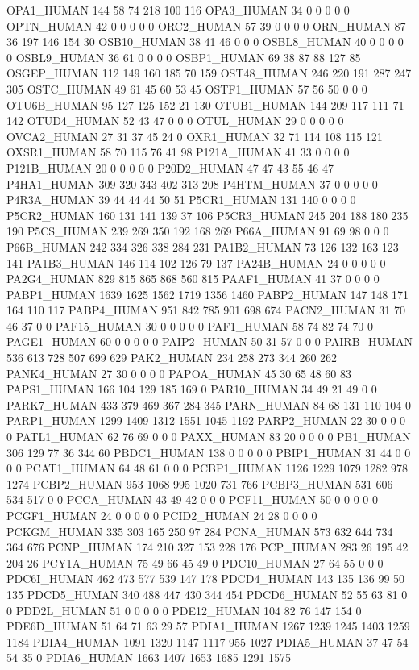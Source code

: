 OPA1_HUMAN	144	58	74	218	100	116
OPA3_HUMAN	34	0	0	0	0	0
OPTN_HUMAN	42	0	0	0	0	0
ORC2_HUMAN	57	39	0	0	0	0
ORN_HUMAN	87	36	197	146	154	30
OSB10_HUMAN	38	41	46	0	0	0
OSBL8_HUMAN	40	0	0	0	0	0
OSBL9_HUMAN	36	61	0	0	0	0
OSBP1_HUMAN	69	38	87	88	127	85
OSGEP_HUMAN	112	149	160	185	70	159
OST48_HUMAN	246	220	191	287	247	305
OSTC_HUMAN	49	61	45	60	53	45
OSTF1_HUMAN	57	56	50	0	0	0
OTU6B_HUMAN	95	127	125	152	21	130
OTUB1_HUMAN	144	209	117	111	71	142
OTUD4_HUMAN	52	43	47	0	0	0
OTUL_HUMAN	29	0	0	0	0	0
OVCA2_HUMAN	27	31	37	45	24	0
OXR1_HUMAN	32	71	114	108	115	121
OXSR1_HUMAN	58	70	115	76	41	98
P121A_HUMAN	41	33	0	0	0	0
P121B_HUMAN	20	0	0	0	0	0
P20D2_HUMAN	47	47	43	55	46	47
P4HA1_HUMAN	309	320	343	402	313	208
P4HTM_HUMAN	37	0	0	0	0	0
P4R3A_HUMAN	39	44	44	44	50	51
P5CR1_HUMAN	131	140	0	0	0	0
P5CR2_HUMAN	160	131	141	139	37	106
P5CR3_HUMAN	245	204	188	180	235	190
P5CS_HUMAN	239	269	350	192	168	269
P66A_HUMAN	91	69	98	0	0	0
P66B_HUMAN	242	334	326	338	284	231
PA1B2_HUMAN	73	126	132	163	123	141
PA1B3_HUMAN	146	114	102	126	79	137
PA24B_HUMAN	24	0	0	0	0	0
PA2G4_HUMAN	829	815	865	868	560	815
PAAF1_HUMAN	41	37	0	0	0	0
PABP1_HUMAN	1639	1625	1562	1719	1356	1460
PABP2_HUMAN	147	148	171	164	110	117
PABP4_HUMAN	951	842	785	901	698	674
PACN2_HUMAN	31	70	46	37	0	0
PAF15_HUMAN	30	0	0	0	0	0
PAF1_HUMAN	58	74	82	74	70	0
PAGE1_HUMAN	60	0	0	0	0	0
PAIP2_HUMAN	50	31	57	0	0	0
PAIRB_HUMAN	536	613	728	507	699	629
PAK2_HUMAN	234	258	273	344	260	262
PANK4_HUMAN	27	30	0	0	0	0
PAPOA_HUMAN	45	30	65	48	60	83
PAPS1_HUMAN	166	104	129	185	169	0
PAR10_HUMAN	34	49	21	49	0	0
PARK7_HUMAN	433	379	469	367	284	345
PARN_HUMAN	84	68	131	110	104	0
PARP1_HUMAN	1299	1409	1312	1551	1045	1192
PARP2_HUMAN	22	30	0	0	0	0
PATL1_HUMAN	62	76	69	0	0	0
PAXX_HUMAN	83	20	0	0	0	0
PB1_HUMAN	306	129	77	36	344	60
PBDC1_HUMAN	138	0	0	0	0	0
PBIP1_HUMAN	31	44	0	0	0	0
PCAT1_HUMAN	64	48	61	0	0	0
PCBP1_HUMAN	1126	1229	1079	1282	978	1274
PCBP2_HUMAN	953	1068	995	1020	731	766
PCBP3_HUMAN	531	606	534	517	0	0
PCCA_HUMAN	43	49	42	0	0	0
PCF11_HUMAN	50	0	0	0	0	0
PCGF1_HUMAN	24	0	0	0	0	0
PCID2_HUMAN	24	28	0	0	0	0
PCKGM_HUMAN	335	303	165	250	97	284
PCNA_HUMAN	573	632	644	734	364	676
PCNP_HUMAN	174	210	327	153	228	176
PCP_HUMAN	283	26	195	42	204	26
PCY1A_HUMAN	75	49	66	45	49	0
PDC10_HUMAN	27	64	55	0	0	0
PDC6I_HUMAN	462	473	577	539	147	178
PDCD4_HUMAN	143	135	136	99	50	135
PDCD5_HUMAN	340	488	447	430	344	454
PDCD6_HUMAN	52	55	63	81	0	0
PDD2L_HUMAN	51	0	0	0	0	0
PDE12_HUMAN	104	82	76	147	154	0
PDE6D_HUMAN	51	64	71	63	29	57
PDIA1_HUMAN	1267	1239	1245	1403	1259	1184
PDIA4_HUMAN	1091	1320	1147	1117	955	1027
PDIA5_HUMAN	37	47	54	54	35	0
PDIA6_HUMAN	1663	1407	1653	1685	1291	1575
